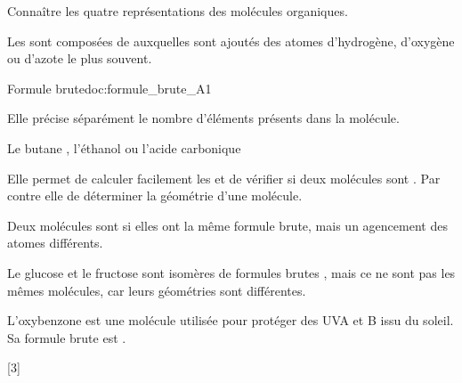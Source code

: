 \tetePremStssOrga
\vspace*{-30pt}


\begin{objectifs}
  \item Connaître les quatre représentations des molécules organiques.
\end{objectifs}

\begin{contexte}
  Les  sont composées de  auxquelles sont ajoutés des atomes d'hydrogène, d'oxygène ou d'azote le plus souvent.
  
\end{contexte}

\vspace*{-12pt}

\vspace*{-8pt}
\begin{doc}{Formule brute}{doc:formule_brute_A1}
  \begin{importants}
    Elle précise séparément le nombre d'éléments présents dans la molécule.
  \end{importants}
  \exemple* Le butane , l'éthanol  ou l'acide carbonique 
  
  Elle permet de calculer facilement les  et de vérifier si deux molécules sont .
  Par contre elle  de déterminer la géométrie d'une molécule.

  \begin{importants}
    Deux molécules sont  si elles ont la même formule brute, mais un agencement des atomes différents.
  \end{importants}
  \exemple* Le glucose et le fructose sont isomères de formules brutes , mais ce ne sont pas les mêmes molécules, car leurs géométries sont différentes.
\end{doc}

L'oxybenzone est une molécule utilisée pour protéger des UVA et B issu du soleil.
Sa formule brute est .

[3]

